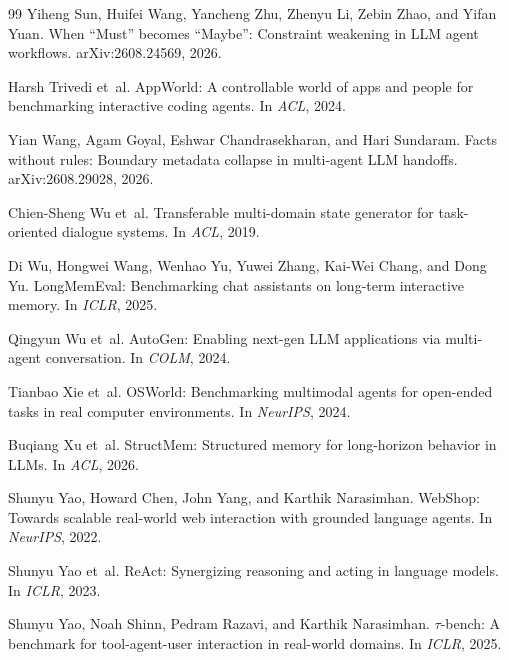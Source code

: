 \documentclass[11pt]{article}
\begin{document}
\begin{thebibliography}{99}
Yiheng Sun, Huifei Wang, Yancheng Zhu, Zhenyu Li, Zebin Zhao, and Yifan Yuan.
\newblock When ``Must'' becomes ``Maybe'': Constraint weakening in LLM agent workflows.
\newblock arXiv:2608.24569, 2026.

Harsh Trivedi et~al.
\newblock AppWorld: A controllable world of apps and people for benchmarking interactive coding agents.
\newblock In \emph{ACL}, 2024.

Yian Wang, Agam Goyal, Eshwar Chandrasekharan, and Hari Sundaram.
\newblock Facts without rules: Boundary metadata collapse in multi-agent LLM handoffs.
\newblock arXiv:2608.29028, 2026.

Chien-Sheng Wu et~al.
\newblock Transferable multi-domain state generator for task-oriented dialogue systems.
\newblock In \emph{ACL}, 2019.

Di Wu, Hongwei Wang, Wenhao Yu, Yuwei Zhang, Kai-Wei Chang, and Dong Yu.
\newblock LongMemEval: Benchmarking chat assistants on long-term interactive memory.
\newblock In \emph{ICLR}, 2025.

Qingyun Wu et~al.
\newblock AutoGen: Enabling next-gen LLM applications via multi-agent conversation.
\newblock In \emph{COLM}, 2024.

Tianbao Xie et~al.
\newblock OSWorld: Benchmarking multimodal agents for open-ended tasks in real computer environments.
\newblock In \emph{NeurIPS}, 2024.

Buqiang Xu et~al.
\newblock StructMem: Structured memory for long-horizon behavior in LLMs.
\newblock In \emph{ACL}, 2026.

Shunyu Yao, Howard Chen, John Yang, and Karthik Narasimhan.
\newblock WebShop: Towards scalable real-world web interaction with grounded language agents.
\newblock In \emph{NeurIPS}, 2022.

Shunyu Yao et~al.
\newblock ReAct: Synergizing reasoning and acting in language models.
\newblock In \emph{ICLR}, 2023.

Shunyu Yao, Noah Shinn, Pedram Razavi, and Karthik Narasimhan.
\newblock \(\tau\)-bench: A benchmark for tool-agent-user interaction in real-world domains.
\newblock In \emph{ICLR}, 2025.


\end{thebibliography}
\end{document}

